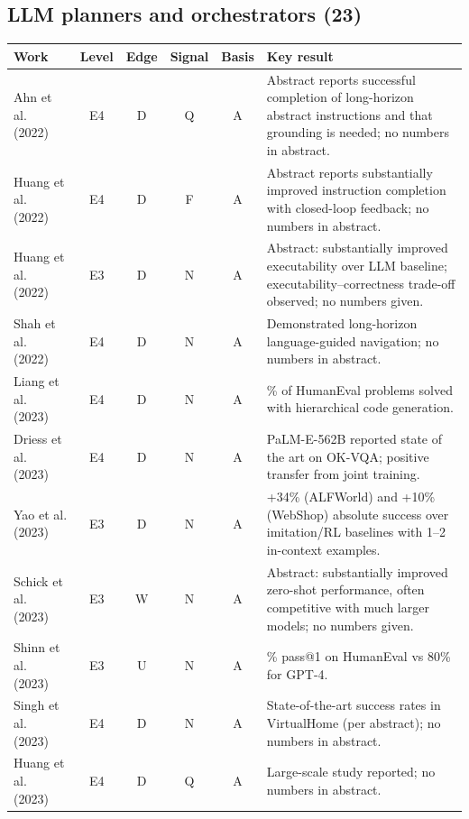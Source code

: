 \documentclass[10pt,a4paper]{article}
\begin{document}
\subsection*{LLM planners and orchestrators (23)}
\begin{longtable}{@{}>{\raggedright\arraybackslash}p{4.0cm}cccc>{\raggedright\arraybackslash}p{7.6cm}@{}}
\toprule \textbf{Work} & \textbf{Level} & \textbf{Edge} & \textbf{Signal} & \textbf{Basis} & \textbf{Key result} \\ \midrule \endhead
Ahn et al. (2022)~\cite{Ahn2022} & E4 & D & Q & A & Abstract reports successful completion of long-horizon abstract instructions and that grounding is needed; no numbers in abstract. \\
Huang et al. (2022)~\cite{Huang2022b} & E4 & D & F & A & Abstract reports substantially improved instruction completion with closed-loop feedback; no numbers in abstract. \\
Huang et al. (2022)~\cite{Huang2022a} & E3 & D & N & A & Abstract: substantially improved executability over LLM baseline; executability--correctness trade-off observed; no numbers given. \\
Shah et al. (2022)~\cite{Shah2022} & E4 & D & N & A & Demonstrated long-horizon language-guided navigation; no numbers in abstract. \\
Liang et al. (2023)~\cite{Liang2023} & E4 & D & N & A & 39.8\% of HumanEval problems solved with hierarchical code generation. \\
Driess et al. (2023)~\cite{Driess2023} & E4 & D & N & A & PaLM-E-562B reported state of the art on OK-VQA; positive transfer from joint training. \\
Yao et al. (2023)~\cite{Yao2023a} & E3 & D & N & A & +34\% (ALFWorld) and +10\% (WebShop) absolute success over imitation/RL baselines with 1--2 in-context examples. \\
Schick et al. (2023)~\cite{Schick2023} & E3 & W & N & A & Abstract: substantially improved zero-shot performance, often competitive with much larger models; no numbers given. \\
Shinn et al. (2023)~\cite{Shinn2023} & E3 & U & N & A & 91\% pass@1 on HumanEval vs 80\% for GPT-4. \\
Singh et al. (2023)~\cite{Singh2023} & E4 & D & N & A & State-of-the-art success rates in VirtualHome (per abstract); no numbers in abstract. \\
Huang et al. (2023)~\cite{Huang2023a} & E4 & D & Q & A & Large-scale study reported; no numbers in abstract. \\

\end{longtable}
\end{document}
